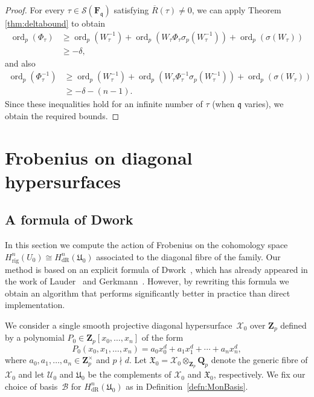 \documentclass[a4paper,11pt]{article}
\numberwithin{equation}{section}
\newcommand{\ZZ}{\mathbf{Z}} %
\newcommand{\QQ}{\mathbf{Q}} %
\newcommand{\FF}{\mathbf{F}} %
\DeclareMathOperator{\ord}{ord}          %
\providecommand{\HdR}{H_{\text{dR}}}    %
\providecommand{\Hrig}{H_{\text{rig}}}  %
\providecommand{\cB}{\mathcal{B}} %
\theoremstyle{definition}
\begin{document}
\begin{proof}
For every $\tau \in \mathcal{S}(\FF_{\mathfrak{q}})$ satisfying $\overline{R}(\tau) \neq 0$, we can apply Theorem
\ref{thm:deltabound} to obtain
\begin{align*}
\ord_p(\Phi_{\tau}) &\geq \ord_p(W^{-1}_{\tau}) + \ord_p(W_{\tau} \Phi_{\tau} \sigma_p(W_{\tau}^{-1})) + \ord_p(\sigma(W_{\tau})) \\
&\geq -\delta,
\end{align*}
and also
\begin{align*}
\ord_p(\Phi^{-1}_{\tau}) &\geq \ord_p(W^{-1}_{\tau}) + \ord_p(W_{\tau} \Phi^{-1}_{\tau} \sigma_p(W_{\tau}^{-1})) + \ord_p(\sigma(W_{\tau})) \\
&\geq -\delta - (n-1).
\end{align*}
Since these inequalities hold for an infinite number of $\tau$ (when $\mathfrak{q}$ varies), we obtain the required bounds.
\end{proof}


\section{Frobenius on diagonal hypersurfaces}
\label{sec:Diagonal}

\subsection{A formula of Dwork}

In this section we compute the action of Frobenius on the cohomology 
space $\Hrig^{n}(U_0) \cong \HdR^{n}(\mathfrak{U}_0)$ associated 
to the diagonal fibre of the family. Our method is based on an 
explicit formula of Dwork~\citep[\S 4]{Dwork1964}, which has already 
appeared in the work of Lauder~\citep[\S 6]{Lauder2004b} and 
Gerkmann~\citep[\S 4.4]{Gerkmann2007}. However, by rewriting this formula 
we obtain an algorithm that performs significantly better in practice 
than direct implementation.

We consider a single smooth 
projective diagonal hypersurface~$\mathcal{X}_0$ over $\ZZ_p$ defined by 
a polynomial $P_0 \in \ZZ_p[x_0, \dotsc, x_n]$ of the form
\begin{equation*}
P_0(x_0, x_1, \dotsc, x_n) = 
    a_0 x_0^d + a_1 x_1^d + \dotsb + a_n x_n^d,
\end{equation*}
where $a_0, a_1, \dotsc, a_n \in \ZZ_p^{\times}$ and $p \nmid d$. 
Let $\mathfrak{X}_0 = \mathcal{X}_0 \otimes_{\ZZ_p} \QQ_p$ denote the generic 
fibre of $\mathcal{X}_0$ and let $\mathcal{U}_0$ and $\mathfrak{U}_0$ be the complements
of $\mathcal{X}_0$ and $\mathfrak{X}_0$, respectively. 
We fix our choice of basis~$\cB$ for $\HdR^{n}(\mathfrak{U}_0)$ 
as in Definition~\ref{defn:MonBasis}. 
\end{document}
